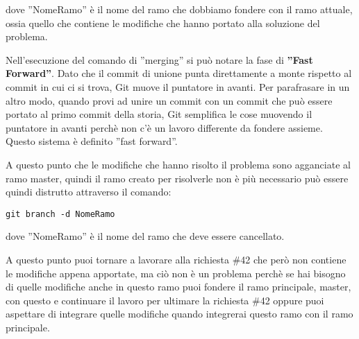 dove ''NomeRamo'' è il nome del ramo che dobbiamo fondere con il ramo attuale, ossia quello che contiene le modifiche che hanno portato alla soluzione del problema.

Nell'esecuzione del comando di ''merging'' si può notare la fase di \textbf{''Fast Forward''}. Dato che il commit di unione punta direttamente a monte rispetto al commit in cui ci si trova, Git muove il puntatore in avanti. Per parafrasare in un altro modo, quando provi ad unire un commit con un commit che può essere portato al primo commit della storia, Git semplifica le cose muovendo il puntatore in avanti perchè non c'è un lavoro differente da fondere assieme. Questo sistema è definito ''fast forward''.

A questo punto che le modifiche che hanno risolto il problema sono agganciate al ramo master, quindi il ramo creato per risolverle non è più necessario può essere quindi distrutto attraverso il comando:

\begin{center}
\texttt{git branch -d NomeRamo}
\end{center}

dove ''NomeRamo'' è il nome del ramo che deve essere cancellato. 

A questo punto puoi tornare a lavorare alla richiesta \#42 che però non contiene le modifiche appena apportate, ma ciò non è un problema perchè se hai bisogno di quelle modifiche anche in questo ramo puoi fondere il ramo principale, master, con questo e continuare il lavoro per ultimare la richiesta \#42 oppure puoi aspettare di integrare quelle modifiche quando integrerai questo ramo con il ramo principale.
